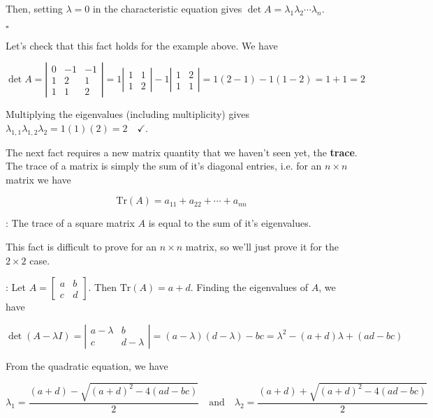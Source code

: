 \documentclass[12pt]{article}
\newcommand{\nin}{\noindent}
\newcommand{\vthree}{\vspace{3mm}}
\newcommand{\myp}[1]{\left( #1 \right)}
\newcommand{\mymat}[1]{
\left[
\begin{array}{rrrrrrrrrrrrrrrrrrrrrrrrrrrrrrrrrrrrrrr}
#1
\end{array}
\right]
}
\newcommand{\mydet}[1]{
\left|
\begin{array}{rrrrrrrrrrrrrrrrrrrrrrrrrrrrrrrrrrrrrrr}
#1
\end{array}
\right|
}
\begin{document}
\vthree

\nin Then, setting $\lambda = 0$ in the characteristic equation gives  $\det A = \lambda_1\lambda_2 \cdots \lambda_n$.

\hfill $\square$

\vthree

\nin Let's check that this fact holds for the example above.  We have

\[
\det A =
\mydet{
0 & -1 & -1 \\
1 & 2 & 1 \\
1 & 1 & 2
} = 1 \mydet{1 & 1 \\ 1 & 2} - 1\mydet{1 & 2 \\ 1 & 1} = 1\myp{2 - 1} - 1\myp{1 - 2} =1 + 1 = 2
\]

\vthree

\nin Multiplying the eigenvalues (including multiplicity) gives $\lambda_{1,1}\lambda_{1,2}\lambda_2 = 1\myp{1}\myp{2} = 2 \quad \checkmark$.

\vthree

\nin The next fact requires a new matrix quantity that we haven't seen yet, the {\bf trace}.  The trace of a matrix is simply the sum of it's diagonal entries, i.e. for an $n \times n$ matrix we have

\[
\textrm{Tr}\myp{A} = a_{11} + a_{22} + \cdots + a_{nn}
\]

\vthree

\nin {\bf Fact 2}: The trace of a square matrix $A$ is equal to the sum of it's eigenvalues.

\vthree

\nin This fact is difficult to prove for an $n \times n$ matrix, so we'll just prove it for the $2 \times 2$ case.

\vthree

\nin {\bf Proof}:  Let $A = \mymat{a & b \\ c & d}$.  Then $\textrm{Tr}\myp{A} = a + d$.  Finding the eigenvalues of $A$, we have

\[
\det\myp{A - \lambda I} =
\mydet{
a - \lambda & b \\
c & d - \lambda
} = \myp{a-\lambda}\myp{d - \lambda} - bc = \lambda^2 - \myp{a + d}\lambda + \myp{ad - bc}
\]

\vthree

\nin From the quadratic equation, we have

\[
\lambda_1 = \frac{\myp{a+d} - \sqrt{\myp{a+d}^2 - 4\myp{ad-bc}}}{2} \quad \textrm{and} \quad
\lambda_2 = \frac{\myp{a+d} + \sqrt{\myp{a+d}^2 - 4\myp{ad-bc}}}{2}
\]
\end{document}
